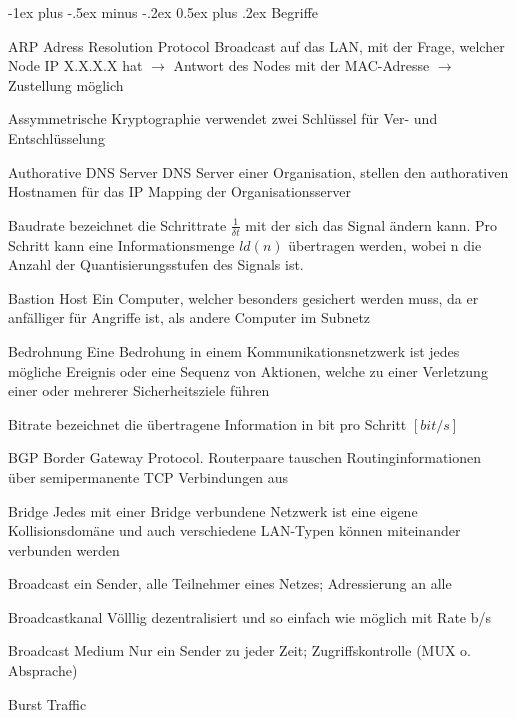 \documentclass[10pt,landscape]{article}
\makeatletter
\renewcommand{\section}{\@startsection{section}{1}{0mm}%
                                {-1ex plus -.5ex minus -.2ex}%
                                {0.5ex plus .2ex}%
                                {\normalfont\large\bfseries}}
\makeatother
\begin{document}
\begin{multicols}{3}
    \section{Begriffe}
    \begin{description*}
        \item[ARP] Adress Resolution Protocol Broadcast auf das LAN, mit der Frage, welcher Node IP X.X.X.X hat $\rightarrow$ Antwort des Nodes mit der MAC-Adresse $\rightarrow$ Zustellung möglich
        \item[Assymmetrische Kryptographie] verwendet zwei Schlüssel für Ver- und Entschlüsselung
        \item[Authorative DNS Server] DNS Server einer Organisation, stellen den authorativen Hostnamen für das IP Mapping der Organisationsserver
        \item[Baudrate] bezeichnet die Schrittrate $\frac{1}{\delta t}$ mit der sich das Signal ändern kann. Pro Schritt kann eine Informationsmenge $ld(n)$ übertragen werden, wobei n die Anzahl der
        Quantisierungsstufen des Signals ist. %
        \item[Bastion Host] Ein Computer, welcher besonders gesichert werden muss, da er anfälliger für Angriffe ist, als andere Computer im Subnetz
        \item[Bedrohnung] Eine Bedrohung in einem Kommunikationsnetzwerk ist jedes mögliche Ereignis oder eine Sequenz von Aktionen, welche zu einer Verletzung einer oder mehrerer Sicherheitsziele führen
        \item[Bitrate] bezeichnet die übertragene Information in bit pro Schritt $[bit/s]$
        \item[BGP] Border Gateway Protocol. Routerpaare tauschen Routinginformationen über semipermanente TCP Verbindungen aus
        \item[Bridge] Jedes mit einer Bridge verbundene Netzwerk ist eine eigene Kollisionsdomäne und auch verschiedene LAN-Typen können miteinander verbunden werden
        \item[Broadcast] ein Sender, alle Teilnehmer eines Netzes; Adressierung an alle
        \item[Broadcastkanal] Völllig dezentralisiert und so einfach wie möglich mit Rate b/s
        \item[Broadcast Medium] Nur ein Sender zu jeder Zeit; Zugriffskontrolle (MUX o. Absprache)
        \item[Burst Traffic]

\end{description*}
\end{multicols}
\end{document}
